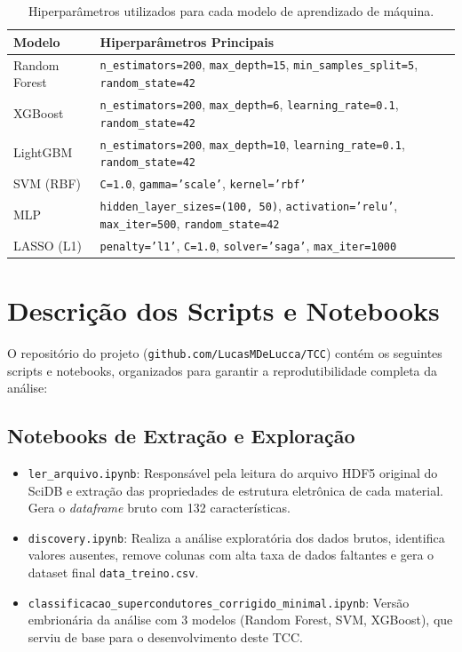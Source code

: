 \documentclass[12pt, a4paper, oneside]{report}
\begin{document}
\begin{table}[H]
    \centering
    \caption{Hiperparâmetros utilizados para cada modelo de aprendizado de máquina.}
    \label{tab:hiperparametros}
    \begin{tabular}{lp{10cm}}
        \toprule
        \textbf{Modelo} & \textbf{Hiperparâmetros Principais} \\
        \midrule
        Random Forest & \texttt{n\_estimators=200}, \texttt{max\_depth=15}, \texttt{min\_samples\_split=5}, \texttt{random\_state=42} \\
        XGBoost & \texttt{n\_estimators=200}, \texttt{max\_depth=6}, \texttt{learning\_rate=0.1}, \texttt{random\_state=42} \\
        LightGBM & \texttt{n\_estimators=200}, \texttt{max\_depth=10}, \texttt{learning\_rate=0.1}, \texttt{random\_state=42} \\
        SVM (RBF) & \texttt{C=1.0}, \texttt{gamma='scale'}, \texttt{kernel='rbf'} \\
        MLP & \texttt{hidden\_layer\_sizes=(100, 50)}, \texttt{activation='relu'}, \texttt{max\_iter=500}, \texttt{random\_state=42} \\
        LASSO (L1) & \texttt{penalty='l1'}, \texttt{C=1.0}, \texttt{solver='saga'}, \texttt{max\_iter=1000} \\
        \bottomrule
    \end{tabular}
\end{table}

\section{Descrição dos Scripts e Notebooks}

O repositório do projeto (\texttt{github.com/LucasMDeLucca/TCC}) contém os seguintes scripts e notebooks, organizados para garantir a reprodutibilidade completa da análise:

\subsection{Notebooks de Extração e Exploração}

\begin{itemize}
    \item \texttt{ler\_arquivo.ipynb}: Responsável pela leitura do arquivo HDF5 original do SciDB e extração das propriedades de estrutura eletrônica de cada material. Gera o \textit{dataframe} bruto com 132 características.
    \item \texttt{discovery.ipynb}: Realiza a análise exploratória dos dados brutos, identifica valores ausentes, remove colunas com alta taxa de dados faltantes e gera o dataset final \texttt{data\_treino.csv}.
    \item \texttt{classificacao\_supercondutores\_corrigido\_minimal.ipynb}: Versão embrionária da análise com 3 modelos (Random Forest, SVM, XGBoost), que serviu de base para o desenvolvimento deste TCC.
\end{itemize}
\end{document}

